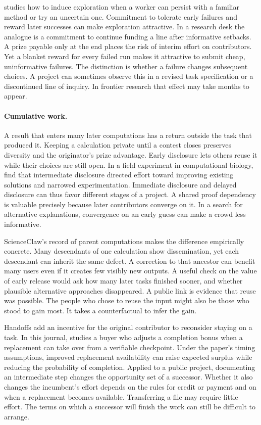 \documentclass[11pt,letterpaper]{article}
\begin{document}
\citet{manso} studies how to induce exploration when a worker can persist with a familiar method or try an uncertain one. Commitment to tolerate early failures and reward later successes can make exploration attractive. In a research desk the analogue is a commitment to continue funding a line after informative setbacks. A prize payable only at the end places the risk of interim effort on contributors. Yet a blanket reward for every failed run makes it attractive to submit cheap, uninformative failures. The distinction is whether a failure changes subsequent choices. A project can sometimes observe this in a revised task specification or a discontinued line of inquiry. In frontier research that effect may take months to appear.

\paragraph{Cumulative work.}
A result that enters many later computations has a return outside the task that produced it. Keeping a calculation private until a contest closes preserves diversity and the originator's prize advantage. Early disclosure lets others reuse it while their choices are still open. In a field experiment in computational biology, \citet{disclosure} find that intermediate disclosure directed effort toward improving existing solutions and narrowed experimentation. Immediate disclosure and delayed disclosure can thus favor different stages of a project. A shared proof dependency is valuable precisely because later contributors converge on it. In a search for alternative explanations, convergence on an early guess can make a crowd less informative.

ScienceClaw's record of parent computations makes the difference empirically concrete. Many descendants of one calculation show dissemination, yet each descendant can inherit the same defect. A correction to that ancestor can benefit many users even if it creates few visibly new outputs. A useful check on the value of early release would ask how many later tasks finished sooner, and whether plausible alternative approaches disappeared. A public link is evidence that reuse was possible. The people who chose to reuse the input might also be those who stood to gain most. It takes a counterfactual to infer the gain.

Handoffs add an incentive for the original contributor to reconsider staying on a task. In this journal, \citet{portable} studies a buyer who adjusts a completion bonus when a replacement can take over from a verifiable checkpoint. Under the paper's timing assumptions, improved replacement availability can raise expected surplus while reducing the probability of completion. Applied to a public project, documenting an intermediate step changes the opportunity set of a successor. Whether it also changes the incumbent's effort depends on the rules for credit or payment and on when a replacement becomes available. Transferring a file may require little effort. The terms on which a successor will finish the work can still be difficult to arrange.
\end{document}
